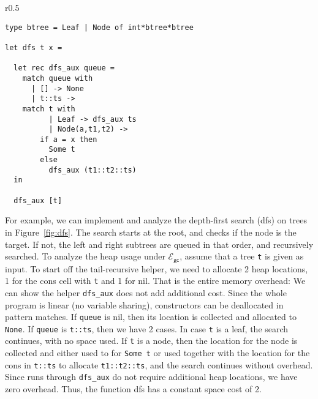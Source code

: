 \documentclass{easychair}
\newcommand{\ms}[1]{\ensuremath{\mathsf{#1}}}
\newcommand{\gcSem}{\ensuremath{\mathcal{E}_{\ms{gc}}}}
\theoremstyle{definition}
\begin{document}
\begin{wrapfigure}{r}{0.5\textwidth}
	\vspace{-20pt}
		\begin{center}
\begin{verbatim}
type btree = Leaf | Node of int*btree*btree

let dfs t x =

  let rec dfs_aux queue =
    match queue with
      | [] -> None
      | t::ts -> 
	match t with
          | Leaf -> dfs_aux ts
          | Node(a,t1,t2) -> 
	    if a = x then 
	      Some t 
	    else 
	      dfs_aux (t1::t2::ts)
  in

  dfs_aux [t]
\end{verbatim}
			\end{center}
				\vspace{-20pt}
			\caption{dfs algorithm}
		\vspace{-10pt}
\label{fig:dfs}
\end{wrapfigure}


For example, we can implement and analyze the depth-first search (dfs) on trees 
in Figure~\ref{fig:dfs}.
The search starts at the root, and checks if the node is the target. If not, 
the left and right subtrees are queued in that order, and recursively searched.
%
To analyze the heap usage under \gcSem{}, assume that a tree \texttt{t} is given 
as input. To start off the tail-recursive helper, we need to allocate 2 heap locations,
1 for the cons cell with \texttt{t} and 1 for nil. That is the entire memory overhead: 
We can show the helper \texttt{dfs\_aux} does not add additional cost. Since the whole program is 
linear (no variable sharing), constructors can be deallocated in pattern matches.
If \texttt{queue} is nil, then its location is collected and allocated to \texttt{None}.
If \texttt{queue} is \texttt{t::ts}, then we have 2 cases. In case \texttt{t} is a leaf, 
the search continues, with no space used. If \texttt{t} is a node, then the location for the node
is collected and either used to for \texttt{Some t} or used together with the location for 
the cons in \texttt{t::ts} to allocate \texttt{t1::t2::ts}, and the search continues without 
overhead. Since runs through \texttt{dfs\_aux} do not require additional heap locations, 
we have zero overhead. Thus, the function dfs has a constant space cost of 2.

\end{document}
